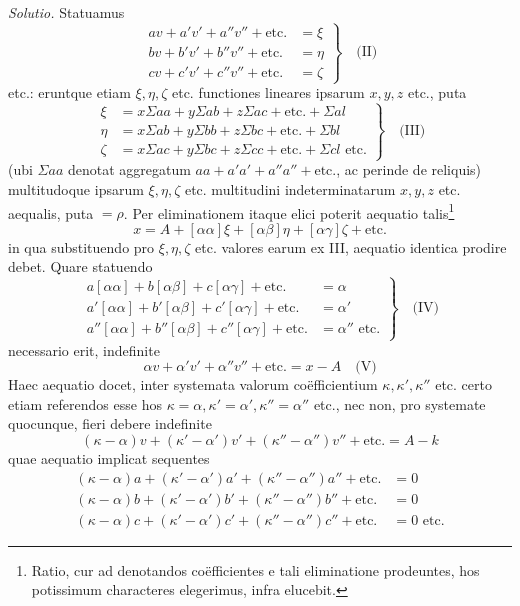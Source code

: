 \textit{Solutio.} Statuamus
\[
\left.\begin{aligned}
av+a'v'+a''v''+\text{etc.}&=\xi\\
bv+b'v'+b''v''+\text{etc.}&=\eta\\
cv+c'v'+c''v''+\text{etc.}&=\zeta
\end{aligned}\right\}\quad\text{(II)}
\]
etc.: eruntque etiam \(\xi,\eta,\zeta\) etc. functiones lineares ipsarum \(x,y,z\) etc., puta
\[
\left.\begin{aligned}
\xi&=x\Sigma aa+y\Sigma ab+z\Sigma ac+\text{etc.}+\Sigma al\\
\eta&=x\Sigma ab+y\Sigma bb+z\Sigma bc+\text{etc.}+\Sigma bl\\
\zeta&=x\Sigma ac+y\Sigma bc+z\Sigma cc+\text{etc.}+\Sigma cl\text{ etc.}
\end{aligned}\right\}\quad\text{(III)}
\]
(ubi \(\Sigma aa\) denotat aggregatum \(aa+a'a'+a''a''+\text{etc.}\), ac perinde de reliquis) multitudoque ipsarum \(\xi,\eta,\zeta\) etc. multitudini indeterminatarum \(x,y,z\) etc. aequalis, puta \(=\rho\). Per eliminationem itaque elici poterit aequatio talis\footnote{Ratio, cur ad denotandos coëfficientes e tali eliminatione prodeuntes, hos potissimum characteres elegerimus, infra elucebit.}
\[
x=A+[\alpha\alpha]\xi+[\alpha\beta]\eta+[\alpha\gamma]\zeta+\text{etc.}
\]
in qua substituendo pro \(\xi,\eta,\zeta\) etc. valores earum ex III, aequatio identica prodire debet. Quare statuendo
\[
\left.\begin{aligned}
a[\alpha\alpha]+b[\alpha\beta]+c[\alpha\gamma]+\text{etc.}&=\alpha\\
a'[\alpha\alpha]+b'[\alpha\beta]+c'[\alpha\gamma]+\text{etc.}&=\alpha'\\
a''[\alpha\alpha]+b''[\alpha\beta]+c''[\alpha\gamma]+\text{etc.}&=\alpha''\text{ etc.}
\end{aligned}\right\}\quad\text{(IV)}
\]
necessario erit, indefinite
\[
\alpha v+\alpha'v'+\alpha''v''+\text{etc.}=x-A\quad\text{(V)}
\]
Haec aequatio docet, inter systemata valorum coëfficientium \(\kappa,\kappa',\kappa''\) etc. certo etiam referendos esse hos \(\kappa=\alpha,\kappa'=\alpha',\kappa''=\alpha''\) etc., nec non, pro systemate quocunque, fieri debere indefinite
\[
(\kappa-\alpha)v+(\kappa'-\alpha')v'+(\kappa''-\alpha'')v''+\text{etc.}=A-k
\]
quae aequatio implicat sequentes
\[
\begin{aligned}
(\kappa-\alpha)a+(\kappa'-\alpha')a'+(\kappa''-\alpha'')a''+\text{etc.}&=0\\
(\kappa-\alpha)b+(\kappa'-\alpha')b'+(\kappa''-\alpha'')b''+\text{etc.}&=0\\
(\kappa-\alpha)c+(\kappa'-\alpha')c'+(\kappa''-\alpha'')c''+\text{etc.}&=0\text{ etc.}
\end{aligned}
\]

